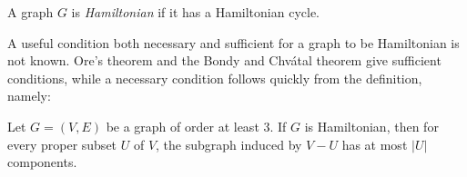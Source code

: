\documentclass[12pt]{article}
\begin{document}
A graph $G$ is \emph{Hamiltonian} if it has a Hamiltonian cycle.

A useful condition both necessary and sufficient for a graph to be Hamiltonian is not known.  Ore's theorem and the Bondy and Chv\'atal theorem give sufficient conditions, while a necessary condition follows quickly from the definition, namely:

Let $G=(V,E)$ be a graph of order at least 3. If $G$ is Hamiltonian, then for every proper subset $U$ of $V$, the subgraph induced by $V-U$ has at most $|U|$ components.
\end{document}
